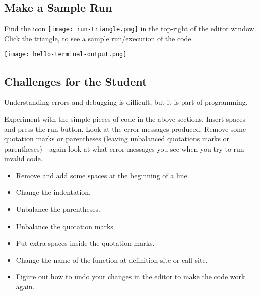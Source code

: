 \subsection{Make a Sample Run}

Find the icon \texttt{[image: run-triangle.png]}
  in the top-right of the editor window.  Click the triangle, to see a sample run/execution of the code.

\noindent\texttt{[image: hello-terminal-output.png]}


\subsection{Challenges for the Student}

Understanding errors and debugging is difficult, but it is part of programming.

Experiment with the simple pieces of code in the above sections.
Insert spaces and press the run button.  Look at the error messages
produced. Remove some quotation marks or parentheses (leaving
unbalanced quotations marks or parentheses)---again look at what error
messages you see when you try to run invalid code.


\begin{itemize}
\item Remove and add some spaces at the beginning of a line.
\item Change the indentation.
\item Unbalance the parentheses.
\item Unbalance the quotation marks.
\item Put extra spaces inside the quotation marks.
\item Change the name of the  function at definition site or call site.
\item Figure out how to undo your changes in the editor to make the code work again.
\end{itemize}

\clearpage

